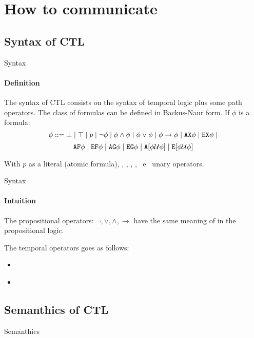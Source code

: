 \section{How to communicate}
\subsection{Syntax of CTL}
\begin{frame}{Syntax}
	\framesubtitle{Definition}
	The syntax of CTL consists on the syntax of temporal logic plus some path operators. The class of formulas can be defined in Backus-Naur form. If $\phi$ is a formula: \pause
	$$\phi ::= \bot \; | \; \top \; | \; p \; | \; \neg \phi \; | \; \phi \land \phi \; | \; \phi \lor \phi \; | \; \phi \to \phi \; | \; \texttt{AX} \phi \; | \; \texttt{EX} \phi \; | $$
	$$\texttt{AF} \phi \; | \; \texttt{EF} \phi \; | \; \texttt{AG} \phi \; | \; \texttt{EG} \phi \; | \; \texttt{A}[\phi \mathcal{U} \phi] \; | \; \texttt{E}[\phi \mathcal{U} \phi]$$\pause
	
	With $p$ as a literal (atomic formula), \AX, \EX, \AF, \EF, \AG \, e \EG \, unary operators.
	
\end{frame}

\begin{frame}{Syntax}
	\framesubtitle{Intuition}
	The propositional operators: $\neg, \lor, \land, \to$ have the same meaning of in the propositional logic.\pause
	
	The temporal operators goes as follows: \pause
	\begin{itemize}
		\item 
		{
			\A
			\pause
		}
		\item 
		{
			\E
			\pause
		}
	\end{itemize}
	
\end{frame}
\subsection{Semanthics of CTL}
\begin{frame}{Semanthics}
	
\end{frame}